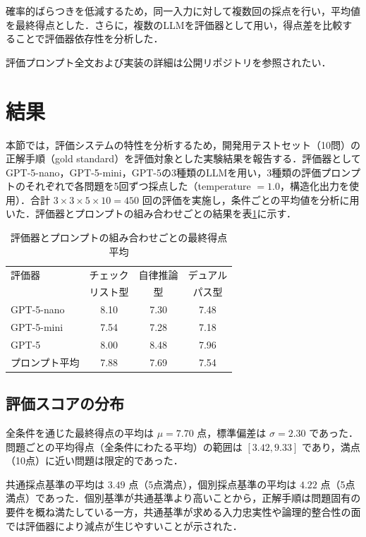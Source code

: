 \documentclass[twocolumn]{jarticle}
\begin{document}
確率的ばらつきを低減するため，同一入力に対して複数回の採点を行い，平均値を最終得点とした．さらに，複数のLLMを評価器として用い，得点差を比較することで評価器依存性を分析した．

評価プロンプト全文および実装の詳細は公開リポジトリを参照されたい．

\section{結果}
本節では，評価システムの特性を分析するため，開発用テストセット（10問）の正解手順（gold standard）を評価対象とした実験結果を報告する．評価器としてGPT-5-nano，GPT-5-mini，GPT-5の3種類のLLMを用い，3種類の評価プロンプトのそれぞれで各問題を5回ずつ採点した（temperature $= 1.0$，構造化出力を使用）．合計 $3 \times 3 \times 5 \times 10 = 450$ 回の評価を実施し，条件ごとの平均値を分析に用いた．評価器とプロンプトの組み合わせごとの結果を表\ref{tab:results_matrix}に示す．

\begin{table}[t]
    \centering
    \caption{評価器とプロンプトの組み合わせごとの最終得点平均}
    \label{tab:results_matrix}
    \begin{tabular}{lccc}
        \toprule
        評価器 & チェック & 自律推論 & デュアル \\
        & リスト型 & 型 & パス型 \\
        \midrule
        GPT-5-nano & 8.10 & 7.30 & 7.48 \\
        GPT-5-mini & 7.54 & 7.28 & 7.18 \\
        GPT-5      & 8.00 & 8.48 & 7.96 \\
        \midrule
        プロンプト平均 & 7.88 & 7.69 & 7.54 \\
        \bottomrule
    \end{tabular}
\end{table}

\subsection{評価スコアの分布}
全条件を通じた最終得点の平均は $\mu = 7.70$ 点，標準偏差は $\sigma = 2.30$ であった．問題ごとの平均得点（全条件にわたる平均）の範囲は $[3.42, 9.33]$ であり，満点（10点）に近い問題は限定的であった．

共通採点基準の平均は $3.49$ 点（5点満点），個別採点基準の平均は $4.22$ 点（5点満点）であった．個別基準が共通基準より高いことから，正解手順は問題固有の要件を概ね満たしている一方，共通基準が求める入力忠実性や論理的整合性の面では評価器により減点が生じやすいことが示された．
\end{document}
